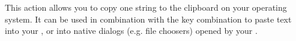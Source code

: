This action allows you to copy one string to the clipboard on your operating system. It can be used in combination with the key combination  to paste text into your \gdaut{}, or into native dialogs (e.g. file choosers) opened by your \gdaut{}. 
